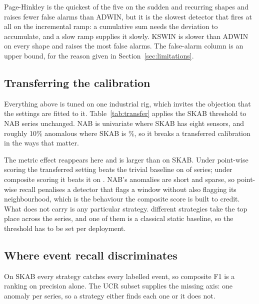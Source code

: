 Page-Hinkley is the quickest of the five on the sudden and recurring shapes and
raises fewer false alarms than ADWIN, but it is the slowest detector that fires
at all on the incremental ramp: a cumulative sum needs the deviation to
accumulate, and a slow ramp supplies it slowly. KSWIN is slower than ADWIN on
every shape and raises the most false alarms. The false-alarm column is an upper
bound, for the reason given in Section~\ref{sec:limitations}.

\subsection{Transferring the calibration}
\label{sec:transfer}

Everything above is tuned on one industrial rig, which invites the objection
that the settings are fitted to it. Table~\ref{tab:transfer} applies the SKAB
threshold to \NNabSeries{} NAB series unchanged. NAB is univariate where SKAB
has eight sensors, and roughly 10\% anomalous where SKAB is \BaseRate\%, so it
breaks a transferred calibration in the ways that matter.

\begin{table}[t]
\centering
\small

\caption{NAB series with the SKAB threshold carried over unchanged, showing the
best strategy per series by composite F1. The flag-everything column is the
trivial baseline for that series.}
\label{tab:transfer}
\end{table}

The metric effect reappears here and is larger than on SKAB. Under point-wise
scoring the transferred setting beats the trivial baseline on
\NNabBeatsPoint{} of \NNabSeries{} series; under composite scoring it beats it
on \NNabBeatsComposite{}. NAB's anomalies are short and sparse, so point-wise
recall penalises a detector that flags a window without also flagging its
neighbourhood, which is the behaviour the composite score is built to credit.
What does not carry is any particular strategy. \NNabDistinctWinners{}
different strategies take the top place across the \NNabSeries{} series, and
one of them is a classical static baseline, so the threshold has to be set per
deployment.

\subsection{Where event recall discriminates}
\label{sec:ucr}

On SKAB every strategy catches every labelled event, so composite F1 is a
ranking on precision alone. The UCR subset supplies the missing axis: one anomaly
per series, so a strategy either finds each one or it does not.

